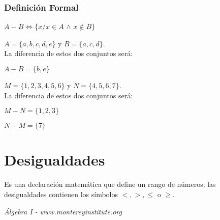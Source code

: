 \documentclass[12pt,a4paper]{book}
\newcommand*\ruleline[1]{\par\noindent\raisebox{.8ex}{\makebox[\linewidth]{\hrulefill\hspace{1ex}\raisebox{-.8ex}{#1}\hspace{1ex}\hrulefill}}}
\begin{document}
{{\subsubsection{Definición Formal}
\begin{center}
$A - B \Leftrightarrow \lbrace x/x \in A$ $\wedge$ $x\notin B \rbrace$
\end{center}

\ruleline{\textbf{Ejemplos}}
 $A = \lbrace a,b,c,d,e \rbrace$ y $B = \lbrace a,c,d \rbrace$.\\ La diferencia de estos dos conjuntos será:
\begin{center}
$A - B = \lbrace b,e \rbrace$
\end{center}

 $M = \lbrace 1,2,3,4,5,6 \rbrace$ y $N = \lbrace 4,5,6,7 \rbrace$.\\ La diferencia de estos dos conjuntos será:
\begin{center}
$M - N = \lbrace 1,2,3 \rbrace$
\end{center}

\begin{center}
$N - M = \lbrace 7 \rbrace$
\end{center}


\section{Desigualdades}
\begin{framed}\noindent
Es una declaración matemática que define un rango de números; las desigualdades contienen los símbolos $<,>,\leq $ o $\geq$.
\begin{flushright}
\textit{{\scriptsize Álgebra I - www.montereyinstitute.org}}
\end{flushright}
\vspace{-0.5cm}
\end{framed}

}}
\end{document}
